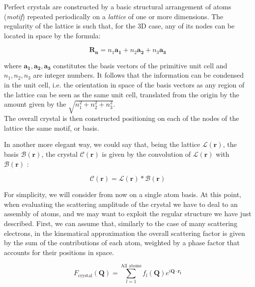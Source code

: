 Perfect crystals are constructed by a basic structural arrangement of atoms (\textit{motif}) repeated periodically on a 
\textit{lattice} of one or more dimensions. The regularity of the lattice is such that, for the 3D case, any of its nodes 
can be located in space by the formula: 

\begin{equation}
   \mathbf {R_n} = n_1\mathbf{a_1} + n_2\mathbf{a_2} + n_3\mathbf{a_3}
   \label{eq:lattice}
\end{equation}

where ${\mathbf{a_1},\mathbf{a_2},\mathbf{a_3}}$ constitutes the basis vectors of the primitive unit cell and $n_1, n_2, n_3$ are integer numbers. 
It follows that the information can be condensed in the unit cell, i.e. the orientation in space of the basis vectors as any region 
of the lattice can be seen as the same unit cell, translated from the origin by the amount given by the $\sqrt{n_1^2 + n_2^2 + n_3^2}$. \\

The overall crystal is then constructed positioning on each of the nodes of the lattice the same motif, or basis. 

In another more elegant way, we could say that, being the lattice $\mathcal{L}(\mathbf r)$, the basis $\mathcal{B}(\mathbf r)$, the crystal 
$\mathcal{C}(\mathbf r)$ is given by the convolution of $\mathcal{L}(\mathbf r)$ with $\mathcal{B}(\mathbf r)$ : 

\begin{equation}
    \mathcal{C}(\mathbf r)  = \mathcal{L}(\mathbf r) \ast  \mathcal{B}(\mathbf r)
    \label{eq:conv}
 \end{equation}

 For simplicity, we will consider from now on a single atom basis.
 At this point, when evaluating the scattering amplitude of the crystal we have to deal to an assembly of atoms, and we 
 may want to exploit the regular structure we have just described. 
 First, we can assume that, similarly to the case of many scattering electrons, in the kinematical approximation the overall 
 scattering factor is given by the sum of the contributions of each atom, weighted by a phase factor that accounts for their 
 positions in space. 

 \begin{equation}
    F_{\text{crystal}}(\mathbf{Q}) = 
   \sum_{l=1}^{\text{All atoms}} f_l(\mathbf Q) e^{i \mathbf{Q} \cdot \mathbf{r_l}} 
   \label{eq:crystalformfactor}
\end{equation} 

